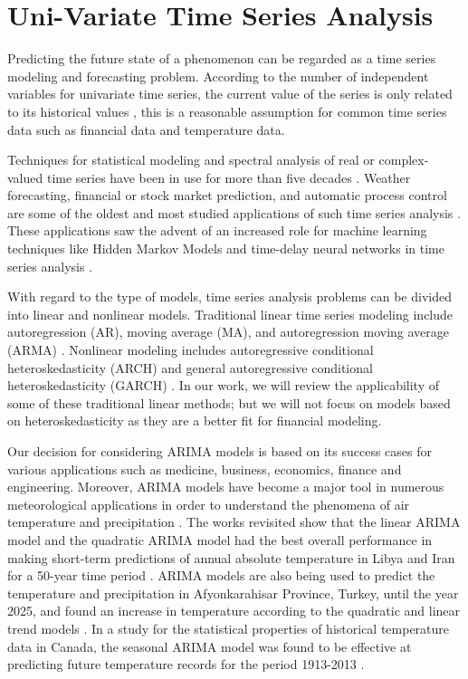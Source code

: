 \section{Uni-Variate Time Series Analysis}
\label{Sec:TSAnalysis}
Predicting the future state of a phenomenon can be regarded as a time series modeling and forecasting problem. According to the number of independent variables for univariate time series, the current value of the series is only related to its historical values \cite{Hyndman2006}, this is a reasonable assumption for common time series data such as financial data and temperature data.

Techniques for statistical modeling and spectral analysis of real or complex-valued time series have been in use for more than five decades \cite{Hyndman2006, Chatfield2019}. Weather forecasting, financial or stock market prediction, and automatic process control are some of the oldest and most studied applications of such time series analysis \cite{Box1976}. These applications saw the advent of an increased role for machine learning techniques like Hidden Markov Models and time-delay neural networks in time series analysis \cite{}.

With regard to the type of models, time series analysis problems can be divided into linear and nonlinear models. Traditional linear time series modeling include autoregression (AR), moving average (MA), and autoregression moving average (ARMA) \cite{Chatfield2001, Murat2018}. Nonlinear modeling includes autoregressive conditional heteroskedasticity (ARCH) \cite{Kirchgassner2008} and general autoregressive conditional heteroskedasticity (GARCH) \cite{Kirchgassner2008}. In our work, we will review the applicability of some of these traditional linear methods; but we will not focus on models based on heteroskedasticity as they are a better fit for financial modeling.

Our decision for considering ARIMA models is based on its success cases for various applications such as medicine, business, economics, finance and engineering. Moreover, ARIMA models have become a major tool in numerous meteorological applications in order to understand the phenomena of air temperature and precipitation \cite{Murat2018}. The works revisited show that the linear ARIMA model and the quadratic ARIMA model had the best overall performance in making short-term predictions of annual absolute temperature in Libya and Iran for a 50-year time period \cite{ElMallah2016}. ARIMA models are also being used to  predict the temperature and precipitation in Afyonkarahisar Province, Turkey, until the year 2025, and found an increase in temperature according to the quadratic and linear trend models \cite{Muhammet2012}. In a study for the statistical properties of historical temperature data in Canada, the seasonal ARIMA model was found to be effective at predicting future temperature records for the period 1913-2013 \cite{Khedhiri2016}.

